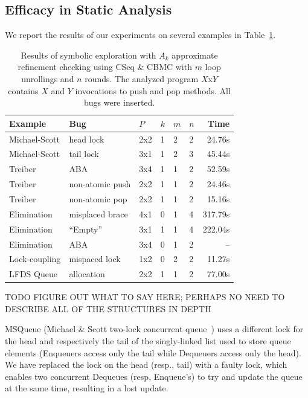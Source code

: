 \subsection{Efficacy in Static Analysis}
\label{sec:exp:static}

We report the results of our experiments on several examples in
Table~\ref{tab:exp:static}.

\begin{table}[t]
  \footnotesize
  \begin{tabular}{llllllr}
  Example    & Bug                 & $P$ & $k$ & $m$ & $n$ & Time \\
  \hline
  Michael-Scott & head lock      & 2x2 & 1 & 2 & 2 & 24.76s \\
  Michael-Scott & tail lock      & 3x1 & 1 & 2 & 3 & 45.44s \\
  Treiber & ABA                  & 3x4 & 1 & 1 & 2 & 52.59s \\
  Treiber & non-atomic push      & 2x2 & 1 & 1 & 2 & 24.46s \\
  Treiber & non-atomic pop       & 2x2 & 1 & 1 & 2 & 15.16s \\
  Elimination & misplaced brace  & 4x1 & 0 & 1 & 4 & 317.79s  \\
  Elimination & ``Empty''        & 3x1 & 1 & 1 & 4 & 222.04s  \\
  Elimination & ABA              & 3x4 & 0 & 1 & 2 & -- \\
  Lock-coupling & mispaced lock & 1x2 & 0 & 2 & 2 & 11.27s \\
  LFDS Queue & allocation           & 2x2 & 1 & 1 & 2 & 77.00s   
  \end{tabular} 
  \caption{Results of symbolic exploration with $A_k$ approximate refinement
    checking using CSeq \& CBMC with $m$ loop unrollings and $n$ rounds. The
    analyzed program $X$x$Y$ contains $X$ and $Y$ invocations to {\sf push} and
    {\sf pop} methods. All bugs were inserted.}
  \label{tab:exp:static}
\end{table}

TODO FIGURE OUT WHAT TO SAY HERE; PERHAPS NO NEED TO DESCRIBE ALL OF THE
STRUCTURES IN DEPTH

MSQueue (Michael \& Scott two-lock concurrent
queue~\cite{conf/podc/MichaelS96}) uses a different lock for the head and
respectively the tail of the singly-linked list used to store queue elements
(Enqueuers access only the tail while Dequeuers access only the head). We have
replaced the lock on the head (resp., tail) with a faulty lock, which enables
two concurrent Dequeues (resp, Enqueue's) to try and update the queue at the
same time, resulting in a lost update.

